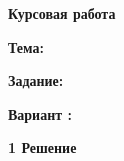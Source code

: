 {\Large \bf Курсовая работа}

{\bf Тема:} \theme
 
{\bf Задание:} \task

{\bf Вариант \textnumero \variantNumber:} \variantTask

{\Large \bf 1 Решение}

\decision
\newpage
